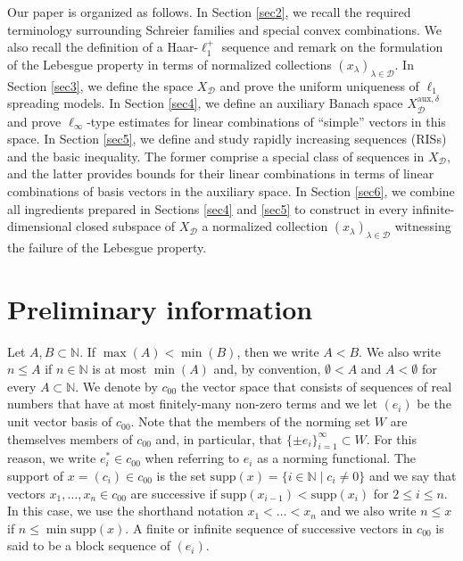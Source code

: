 \documentclass[12pt,a4paper]{amsart}
\newcommand{\N}{\mathbb{N}}
\newcommand{\supp}{\text{supp}}
\theoremstyle{definition}
\theoremstyle{plain}
\begin{document}
Our paper is organized as follows. In Section \ref{sec2}, we recall the required terminology surrounding Schreier families and special convex combinations. We also recall the definition of a Haar-$\ell_1^+$ sequence and remark on the formulation of the Lebesgue property in terms of normalized collections $(x_\lambda)_{\lambda\in\mathcal{D}}$.  In Section \ref{sec3}, we define the space $X_\mathcal{D}$ and prove the uniform uniqueness of $\ell_1$ spreading models. In Section \ref{sec4}, we define an auxiliary Banach space $X_\mathcal{D}^{\mathrm{aux},\delta}$ and prove $\ell_\infty$-type estimates for linear combinations of ``simple'' vectors in this space. In Section \ref{sec5}, we define and study rapidly increasing sequences (RISs) and the basic inequality. The former comprise a special class of sequences in $X_\mathcal{D}$, and the latter provides bounds for their linear combinations in terms of linear combinations of basis vectors in the auxiliary space. In Section \ref{sec6}, we combine all ingredients prepared in Sections \ref{sec4} and \ref{sec5} to construct in every infinite-dimensional closed subspace of $X_\mathcal{D}$ a normalized collection $(x_\lambda)_{\lambda\in\mathcal{D}}$ witnessing the failure of the Lebesgue property.





\section{Preliminary information}{\label{sec2}}
Let $A,B\subset\N$. If $\max(A)<\min(B)$, then we write $A<B$. We also write $n\leq A$ if $n\in\N$ is at most $\min(A)$ and, by convention, $\emptyset<A$ and $A<\emptyset$ for every $A\subset\N$. We denote by $c_{00}$ the vector space that consists of sequences of real numbers that have at most finitely-many non-zero terms and we let $(e_{i})$ be the unit vector basis of $c_{00}$. Note that the members of the norming set $W$ are themselves members of $c_{00}$ and, in particular, that $\{\pm e_{i}\}_{i=1}^{\infty}\subset W$. For this reason, we write $e^{*}_{i}\in c_{00}$ when referring to $e_{i}$ as a norming functional. The support of $x=(c_{i})\in c_{00}$ is the set $\supp(x)=\{i\in\N \mid c_{i}\neq 0\}$ and we say that vectors $x_{1},\ldots,x_{n}\in c_{00}$ are successive if $\supp(x_{i-1})<\supp(x_{i})$ for $2\leq i\leq n$. In this case, we use the shorthand notation $x_{1}<\ldots<x_{n}$ and we also write $n\leq x$ if $n\leq\min\supp(x)$. A finite or infinite sequence of successive vectors in $c_{00}$ is said to be a block sequence of $(e_{i})$.
\end{document}
